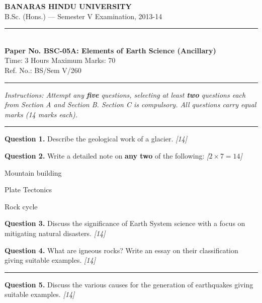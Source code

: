 \documentclass[11pt,a4paper]{article}
\newcommand{\pts}[1]{\hfill   \textit{[#1]}}
\begin{document}
\begin{center}
  {\large\bfseries BANARAS HINDU UNIVERSITY}\\[2pt]
  {\normalsize B.Sc. (Hons.) --- Semester V Examination, 2013-14}\\[6pt]
  \rule{0.8\linewidth}{0.5pt}\\[6pt]
  {\large\bfseries Paper No. BSC-05A: Elements of Earth Science (Ancillary)}\\[4pt]
  {\normalsize Time: 3 Hours \hfill Maximum Marks: 70}\\[2pt]
  {\small Ref. No.: BS/Sem V/260}
\end{center}
\rule{\linewidth}{0.4pt}
\smallskip



\noindent   \textit{Instructions: Attempt any   \textbf{five} questions, selecting at least   \textbf{two} questions each from Section A and Section B. Section C is compulsory. All questions carry equal marks (14 marks each).}
\bigskip

\bigskip


\rule{\linewidth}{0.4pt}\smallskip




\noindent   \textbf{Question 1.} Describe the geological work of a glacier. \pts{14}

\medskip


\noindent   \textbf{Question 2.} Write a detailed note on   \textbf{any two} of the following: \pts{$2  \times 7 = 14$}

\begin{parts}
  \item Mountain building
  \item Plate Tectonics
  \item Rock cycle
\end{parts}

\medskip


\noindent   \textbf{Question 3.} Discuss the significance of Earth System science with a focus on mitigating natural disasters. \pts{14}

\medskip


\noindent   \textbf{Question 4.} What are igneous rocks? Write an essay on their classification giving suitable examples. \pts{14}

\bigskip


\rule{\linewidth}{0.4pt}\smallskip




\noindent   \textbf{Question 5.} Discuss the various causes for the generation of earthquakes giving suitable examples. \pts{14}
\end{document}

